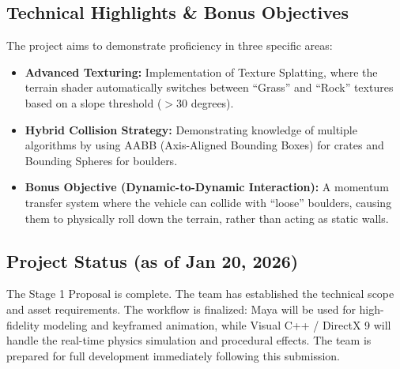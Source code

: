 \documentclass[11pt,a4paper]{article}
\begin{document}
\subsection{Technical Highlights \& Bonus Objectives}

The project aims to demonstrate proficiency in three specific areas:

\begin{itemize}
  \item \textbf{Advanced Texturing:} Implementation of Texture Splatting, where the terrain shader automatically switches between ``Grass'' and ``Rock'' textures based on a slope threshold ($>30$ degrees).
  \item \textbf{Hybrid Collision Strategy:} Demonstrating knowledge of multiple algorithms by using AABB (Axis-Aligned Bounding Boxes) for crates and Bounding Spheres for boulders.
  \item \textbf{Bonus Objective (Dynamic-to-Dynamic Interaction):} A momentum transfer system where the vehicle can collide with ``loose'' boulders, causing them to physically roll down the terrain, rather than acting as static walls.
\end{itemize}

\subsection{Project Status (as of Jan 20, 2026)}

The Stage 1 Proposal is complete. The team has established the technical scope and asset requirements. The workflow is finalized: Maya will be used for high-fidelity modeling and keyframed animation, while Visual C++ / DirectX 9 will handle the real-time physics simulation and procedural effects. The team is prepared for full development immediately following this submission.
\end{document}
